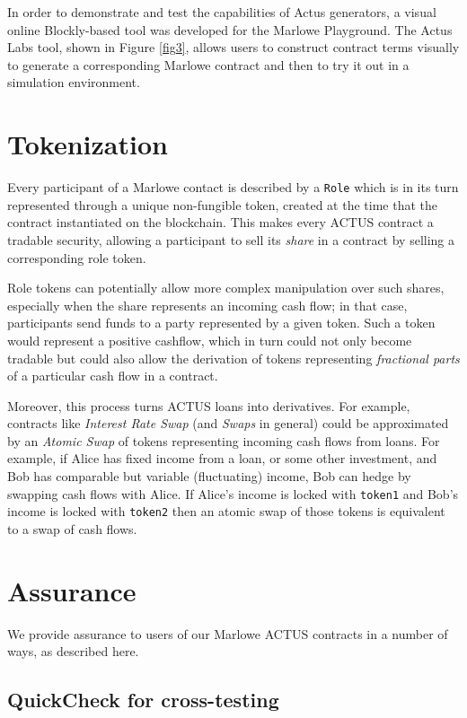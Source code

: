 \documentclass[runningheads]{llncs}
\begin{document}
In order to demonstrate and test the capabilities of Actus generators,
a visual online Blockly-based tool was developed for the Marlowe Playground.
The Actus Labs tool, shown in Figure \ref{fig3}, allows users to construct contract terms visually
to generate a corresponding Marlowe contract and then to try it out in a simulation 
environment.

\section{Tokenization}
\label{tokenization}

Every participant of a Marlowe contact %
is described by a \texttt{Role} which
is in its turn represented through a unique non-fungible token, created at the time that the contract instantiated on the blockchain.
This makes every ACTUS contract a tradable security, allowing a
participant to sell its \emph{share} in a contract by selling a corresponding
role token.

Role tokens can potentially allow more complex manipulation over such shares,
especially when the share represents an incoming cash flow; in that case, participants
send funds to a party represented by a given token. Such a token
would represent a positive cashflow, which in turn could not only become
tradable but could also allow the derivation of tokens representing \emph{fractional parts}
of a particular cash flow in a contract.

Moreover, this process turns ACTUS loans into derivatives. For example, contracts
like \emph{Interest Rate Swap} (and \emph{Swaps} in general) could be approximated
by an \emph{Atomic Swap} of tokens representing incoming cash flows from
loans. 
For example, if Alice has fixed income from a loan, or some other
investment, and Bob has comparable but variable (fluctuating) income,
Bob can hedge by swapping cash flows with Alice. If Alice's income
is locked with \texttt{token1} and Bob's income is locked with \texttt{token2} then an
atomic swap of those tokens is equivalent to a swap of cash flows.

\section{Assurance}
\label{assurance}

We provide assurance to users of our Marlowe ACTUS contracts in a number of ways, as described here. 

\subsection{QuickCheck for cross-testing}
\end{document}
